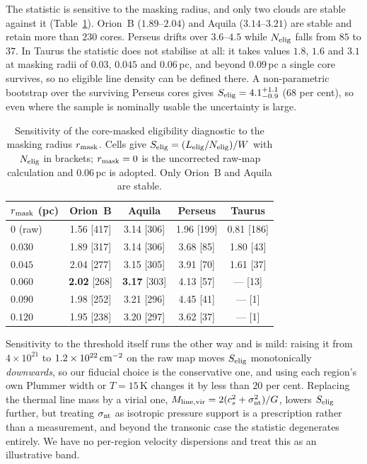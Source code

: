 \documentclass[usenatbib,twoside,twocolumn]{mnras}
\begin{document}
The statistic is sensitive to the masking radius, and only two clouds are stable against it (Table~\ref{tab:maskrad}). Orion~B ($1.89$--$2.04$) and Aquila ($3.14$--$3.21$) are stable and retain more than $230$ cores. Perseus drifts over $3.6$--$4.5$ while $N_{\rm elig}$ falls from $85$ to $37$. In Taurus the statistic does not stabilise at all: it takes values $1.8$, $1.6$ and $3.1$ at masking radii of $0.03$, $0.045$ and $0.06$\,pc, and beyond $0.09$\,pc a single core survives, so no eligible line density can be defined there. A non-parametric bootstrap over the surviving Perseus cores gives $S_{\rm elig}=4.1^{+1.1}_{-0.9}$ ($68$ per cent), so even where the sample is nominally usable the uncertainty is large.

\begin{table}
\caption{Sensitivity of the core-masked eligibility diagnostic to the masking radius $r_{\rm mask}$. Cells give $S_{\rm elig}=(L_{\rm elig}/N_{\rm elig})/W$ with $N_{\rm elig}$ in brackets; $r_{\rm mask}=0$ is the uncorrected raw-map calculation and $0.06$\,pc is adopted. Only Orion~B and Aquila are stable.}
\label{tab:maskrad}
\footnotesize
\setlength{\tabcolsep}{4pt}
\begin{tabular}{lcccc}
\toprule
$r_{\rm mask}$ (pc) & Orion~B & Aquila & Perseus & Taurus \\
\midrule
$0$ (raw) & 1.56 [417] & 3.14 [306] & 1.96 [199] & 0.81 [186] \\
$0.030$   & 1.89 [317] & 3.14 [306] & 3.68 [85]  & 1.80 [43] \\
$0.045$   & 2.04 [277] & 3.15 [305] & 3.91 [70]  & 1.61 [37] \\
$0.060$   & \textbf{2.02} [268] & \textbf{3.17} [303] & 4.13 [57] & --- [13] \\
$0.090$   & 1.98 [252] & 3.21 [296] & 4.45 [41]  & --- [1] \\
$0.120$   & 1.95 [238] & 3.20 [297] & 3.62 [37]  & --- [1] \\
\bottomrule
\end{tabular}
\end{table}

Sensitivity to the threshold itself runs the other way and is mild: raising it from $4\times10^{21}$ to $1.2\times10^{22}\,{\rm cm^{-2}}$ on the raw map moves $S_{\rm elig}$ monotonically \emph{downwards}, so our fiducial choice is the conservative one, and using each region's own Plummer width or $T=15$\,K changes it by less than $20$ per cent. Replacing the thermal line mass by a virial one, $M_{\rm line,vir}=2(c_s^2+\sigma_{\rm nt}^2)/G$, lowers $S_{\rm elig}$ further, but treating $\sigma_{\rm nt}$ as isotropic pressure support is a prescription rather than a measurement, and beyond the transonic case the statistic degenerates entirely. We have no per-region velocity dispersions and treat this as an illustrative band.
\end{document}
